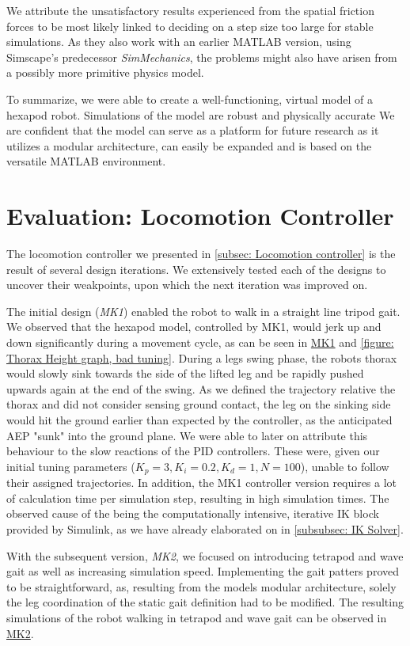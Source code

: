 We attribute the unsatisfactory results \cite{thilderkvist2015motion} experienced from the spatial friction forces to be most likely linked to deciding on a step size too large for stable simulations.
As they also work with an earlier MATLAB version, using Simscape's predecessor \textit{SimMechanics}, the problems might also have arisen from a possibly more primitive physics model.

To summarize, we were able to create a well-functioning, virtual model of a hexapod robot.
Simulations of the model are robust and physically accurate
We are confident that the model can serve as a platform for future research as it utilizes a modular architecture, can easily be expanded and is based on the versatile MATLAB environment.
 

\section{Evaluation: Locomotion Controller}
The locomotion controller we presented in \ref{subsec: Locomotion controller} is the result of several design iterations.
We extensively tested each of the designs to uncover their weakpoints, upon which the next iteration was improved on.

The initial design (\textit{MK1}) enabled the robot to walk in a straight line tripod gait.
We observed that the hexapod model, controlled by MK1, would jerk up and down significantly during a movement cycle, as can be seen in \hyperref[vid: MK1]{MK1} and \ref{figure: Thorax Height graph, bad tuning}.
During a legs swing phase, the robots thorax would slowly sink towards the side of the lifted leg and be rapidly pushed upwards again at the end of the swing.
As we defined the trajectory relative the thorax and did not consider sensing ground contact, the leg on the sinking side would hit the ground earlier than expected by the controller, as the anticipated AEP "sunk" into the ground plane.
We were able to later on attribute this behaviour to the slow reactions of the PID controllers.
These were, given our initial tuning parameters ($K_p = 3, K_i = 0.2, K_d = 1, N = 100$), unable to follow their assigned trajectories. 
In addition, the MK1 controller version requires a lot of calculation time per simulation step, resulting in high simulation times.
The observed cause of the being the computationally intensive, iterative IK block provided by Simulink, as we have already elaborated on in \ref{subsubsec: IK Solver}.

With the subsequent version, \textit{MK2}, we focused on introducing tetrapod and wave gait as well as increasing simulation speed.
Implementing the gait patters proved to be straightforward, as, resulting from the models modular architecture, solely the leg coordination of the static gait definition had to be modified.
The resulting simulations of the robot walking in tetrapod and wave gait can be observed in \hyperref[vid: MK1]{MK2}.

